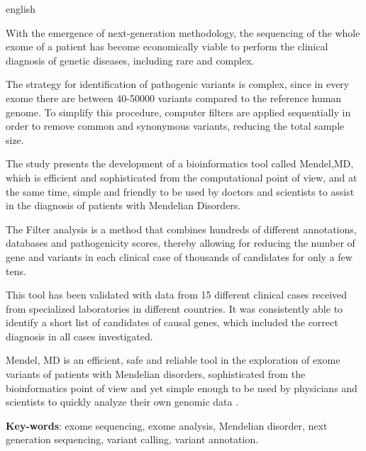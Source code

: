 \documentclass[
	12pt,				%
	openany,			%
	oneside,			%
	a4paper,			%
	english,			%
	brazil,				%
	]{abntex2}
\begin{document}
\begin{resumo}[Abstract]
 \begin{otherlanguage*}{english}

With the emergence of next-generation methodology, the sequencing of the whole exome of a patient has become economically viable to perform the clinical diagnosis of genetic diseases, including rare and complex. 

The strategy for identification of pathogenic variants is complex, since in every exome there are between 40-50000 variants compared to the reference human genome. To simplify this procedure, computer filters are applied sequentially in order to remove common and synonymous variants, reducing the total sample size.

The study presents the development of a bioinformatics tool called Mendel,MD, which is efficient and sophisticated from the computational point of view, and at the same time, simple and friendly to be used by doctors and scientists to assist in the diagnosis of patients with Mendelian Disorders. 

The Filter analysis is a method that combines hundreds of different annotations, databases and pathogenicity scores, thereby allowing for reducing the number of gene and variants in each clinical case of thousands of candidates for only a few tens. 

This tool has been validated with data from 15 different clinical cases received from specialized laboratories in different countries. It was consistently able to identify a short list of candidates of causal genes, which included the correct diagnosis in all cases investigated.

Mendel, MD is an efficient, safe and reliable tool in the exploration of exome variants of patients with Mendelian disorders, sophisticated from the bioinformatics point of view and yet simple enough to be used by physicians and scientists to quickly analyze their own genomic data .

   \vspace{\onelineskip}
 
   \noindent 
   \textbf{Key-words}: exome sequencing, exome analysis, Mendelian disorder, next generation sequencing, variant calling, variant annotation.
 \end{otherlanguage*}
\end{resumo}
\end{document}
